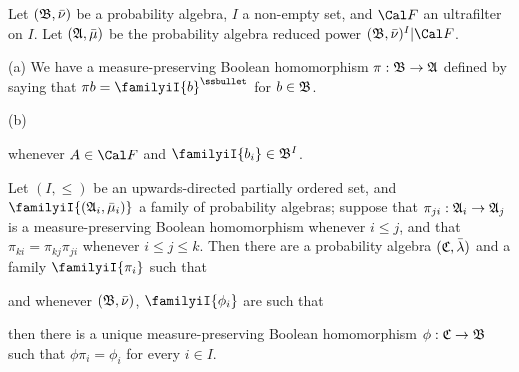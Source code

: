 
Let $(\frak B,\bar\nu)$ be a probability algebra, $I$ a non-empty set, and
$\Cal F$ an ultrafilter on $I$.   Let $(\frak A,\bar\mu)$ be the
probability algebra reduced power $(\frak B,\bar\nu)^I|\Cal F$.

(a) We have a measure-preserving Boolean homomorphism
$\pi:\frak B\to\frak A$ defined by saying that
$\pi b=\familyiI{b}^{\ssbullet}$ for $b\in\frak B$.

(b)


\noindent whenever $A\in\Cal F$ and $\familyiI{b_i}\in\frak B^I$.


 Let $(I,\le)$ be an upwards-directed partially
ordered set, and $\familyiI{(\frak A_i,\bar\mu_i)}$
a family of probability algebras;  suppose
that $\pi_{ji}:\frak A_i\to\frak A_j$ is a measure-preserving
Boolean homomorphism whenever $i\le j$, and that
$\pi_{ki}=\pi_{kj}\pi_{ji}$ whenever $i\le j\le k$.
Then there are a probability algebra $(\frak C,\bar\lambda)$ and a family
$\familyiI{\pi_i}$ such that


\noindent and whenever $(\frak B,\bar\nu)$, $\familyiI{\phi_i}$ are such
that


\noindent then there is a unique measure-preserving Boolean homomorphism
$\phi:\frak C\to\frak B$ such that $\phi\pi_i=\phi_i$ for every $i\in I$.

